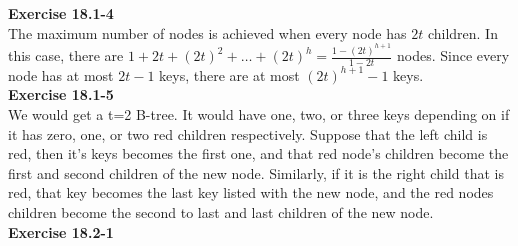 \documentclass{article}
\begin{document}

\noindent\textbf{Exercise 18.1-4}\\

The maximum number of nodes is achieved when every node has $2t$ children.  In this case, there are $1 + 2t + (2t)^2 + \ldots + (2t)^h = \frac{1-(2t)^{h+1}}{1-2t}$ nodes.  Since every node has at most $2t-1$ keys, there are at most $(2t)^{h+1} - 1$ keys. \\

\noindent\textbf{Exercise 18.1-5}\\

We would get a t=2 B-tree. It would have one, two, or three keys depending on if it has zero, one, or two red children respectively. Suppose that the left child is red, then it's keys becomes the first one, and that red node's children become the first and second children of the new node. Similarly, if it is the right child that is red, that key becomes the last key listed with the new node, and the red nodes children become the second to last and last children of the new node.\\

\noindent\textbf{Exercise 18.2-1}\\




\end{document}
